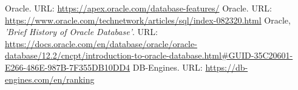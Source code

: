 \documentclass[10pt]{article}
\begin{document}
\begin{thebibliography}{}
	\bibitem{}Oracle. URL: \url{https://apex.oracle.com/database-features/}
	\bibitem{}Oracle. URL: \url{https://www.oracle.com/technetwork/articles/sql/index-082320.html}
	\bibitem{}Oracle, \textit{'Brief History of Oracle Database'}. URL: \url{https://docs.oracle.com/en/database/oracle/oracle-database/12.2/cncpt/introduction-to-oracle-database.html#GUID-35C20601-E266-486E-987B-7F355DB10DD4}
	\bibitem{}DB-Engines. URL: \url{https://db-engines.com/en/ranking}
\end{thebibliography}

 
\end{document}
